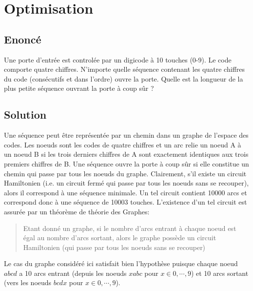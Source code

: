 \documentclass{article}
\newenvironment{statement}{\subsection{Enoncé}}{\pagebreak}
\newenvironment{solution}{\subsection{Solution}}{\pagebreak}
\begin{document}
\section{Optimisation}
\begin{statement}
Une porte d'entrée est controlée par un digicode à 10 touches (0-9). Le code comporte quatre chiffres. N'importe quelle séquence contenant les quatre chiffres du code (consécutifs et dans l'ordre) ouvre la porte. Quelle est la longueur de la plus petite séquence ouvrant la porte à coup sûr ?
\end{statement}
\begin{solution}
Une séquence peut être représentée par un chemin dans un graphe de l'espace des codes. Les noeuds sont les codes de quatre chiffres et un arc relie un noeud A à un noeud B si les trois derniers chiffres de A sont exactement identiques aux trois premiers chiffres de B. Une séquence ouvre la porte à coup sûr si elle constitue un chemin qui passe par tous les noeuds du graphe. Clairement, s'il existe un circuit Hamiltonien (i.e. un circuit fermé qui passe par tous les noeuds sans se recouper), alors il correspond à une séquence minimale. Un tel circuit contient 10000 arcs et correspond donc à une séquence de 10003 touches. L'existence d'un tel circuit est assurée par un théorème de théorie des Graphes:
\begin{quote}
Etant donné un graphe, si le nombre d'arcs entrant à chaque noeud est égal au nombre d'arcs sortant, alors le graphe possède un circuit Hamiltonien (qui passe par tous les noeuds sans se recouper)
\end{quote}
Le cas du graphe considéré ici satisfait bien l'hypothèse puisque chaque noeud $abcd$ a 10 arcs entrant (depuis les noeuds $xabc$ pour $x\in0,\cdots,9$) et 10 arcs sortant (vers les noeuds $bcdx$ pour $x\in0,\cdots,9$).
\end{solution}

\end{document}
